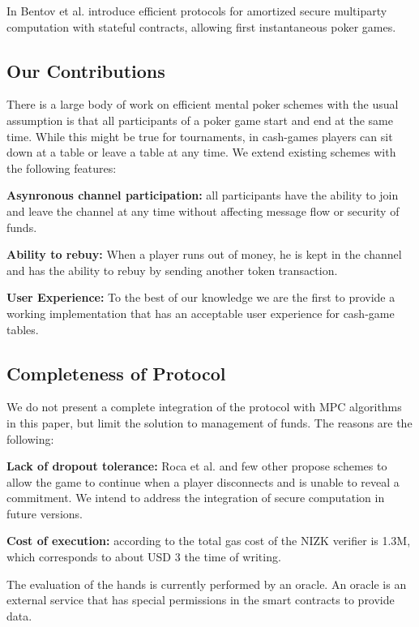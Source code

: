 In \cite{bentov17} Bentov et al. introduce efficient protocols for amortized secure multiparty computation with  stateful contracts, allowing first instantaneous poker games. 

\subsection{Our Contributions}

There is a large body of work on efficient mental poker schemes with the usual assumption is that all participants of a poker game start and end at the same time. While this might be true for tournaments, in cash-games players can sit down at a table or leave a table at any time. We extend existing schemes with the following features:
 
\textbf{Asynronous channel participation:} all participants have the ability to join and leave the channel at any time without affecting message flow or security of funds.
 
\textbf{Ability to rebuy:} When a player runs out of money, he is kept in the channel and has the ability to rebuy by sending another token transaction.

\textbf{User Experience:} To the best of our knowledge we are the first to provide a working implementation that has an acceptable user experience for cash-game tables.

\subsection{Completeness of Protocol}

We do not present a complete integration of the protocol with MPC algorithms in this paper, but limit the solution to management of funds. The reasons are the following:
 
\textbf{Lack of dropout tolerance:} Roca et al. \cite{roca05} and few other propose schemes to allow the game to continue when a player disconnects and is unable to reveal a commitment. We intend to address the integration of secure computation in future versions.
 
\textbf{Cost of execution:} according to \cite{bentov17} the total gas cost of the NIZK verifier \cite{damgard06} is 1.3M, which corresponds to about USD 3 the time of writing.

The evaluation of the hands is currently performed by an oracle. An oracle is an external service that has special permissions in the smart contracts to provide data.


